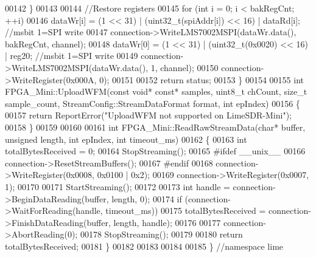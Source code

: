 \begin{DoxyCode}
00142     \}
00143 
00144     \textcolor{comment}{//Restore registers}
00145     \textcolor{keywordflow}{for} (\textcolor{keywordtype}{int} i = 0; i < bakRegCnt; ++i)
00146         dataWr[i] = (1 << 31) | (uint32\_t(spiAddr[i]) << 16) | dataRd[i]; \textcolor{comment}{//msbit 1=SPI write}
00147     connection->WriteLMS7002MSPI(dataWr.data(), bakRegCnt, channel);
00148     dataWr[0] = (1 << 31) | (uint32\_t(0x0020) << 16) | reg20; \textcolor{comment}{//msbit 1=SPI write}
00149     connection->WriteLMS7002MSPI(dataWr.data(), 1, channel);
00150     connection->WriteRegister(0x000A, 0);
00151 
00152     \textcolor{keywordflow}{return} status;
00153 \}
00154 
00155 \textcolor{keywordtype}{int} FPGA_Mini::UploadWFM(\textcolor{keyword}{const} \textcolor{keywordtype}{void}* \textcolor{keyword}{const}* samples, uint8\_t chCount, \textcolor{keywordtype}{size\_t} 
      sample_count, StreamConfig::StreamDataFormat format, \textcolor{keywordtype}{int} epIndex)
00156 \{
00157    \textcolor{keywordflow}{return} ReportError(\textcolor{stringliteral}{"UploadWFM not supported on LimeSDR-Mini"});
00158 \}
00159 
00160 
00161 \textcolor{keywordtype}{int} FPGA_Mini::ReadRawStreamData(\textcolor{keywordtype}{char}* buffer, \textcolor{keywordtype}{unsigned} length, \textcolor{keywordtype}{int} epIndex, \textcolor{keywordtype}{int} 
      timeout_ms)
00162 \{
00163     \textcolor{keywordtype}{int} totalBytesReceived = 0;
00164     StopStreaming();
00165 \textcolor{preprocessor}{#ifdef \_\_unix\_\_}
00166     connection->ResetStreamBuffers();
00167 \textcolor{preprocessor}{#endif}
00168     connection->WriteRegister(0x0008, 0x0100 | 0x2);
00169     connection->WriteRegister(0x0007, 1);
00170 
00171     StartStreaming();
00172 
00173     \textcolor{keywordtype}{int} handle = connection->BeginDataReading(buffer, length, 0);
00174     \textcolor{keywordflow}{if} (connection->WaitForReading(handle, timeout\_ms))
00175         totalBytesReceived = connection->FinishDataReading(buffer, length, handle);
00176 
00177     connection->AbortReading(0);
00178     StopStreaming();
00179 
00180     \textcolor{keywordflow}{return} totalBytesReceived;
00181 \}
00182 
00183 
00184 
00185 \} \textcolor{comment}{//namespace lime}
\end{DoxyCode}
